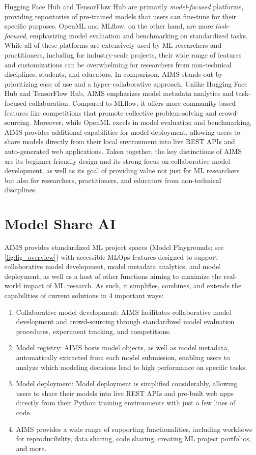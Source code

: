 Hugging Face Hub and TensorFlow Hub are primarily \textit{model-focused} platforms, providing repositories of pre-trained models that users can fine-tune for their specific purposes. OpenML and MLflow, on the other hand, are more \textit{task-focused}, emphasizing model evaluation and benchmarking on standardized tasks. While all of these platforms are extensively used by ML researchers and practitioners, including for industry-scale projects, their wide range of features and customizations can be overwhelming for researchers from non-technical disciplines, students, and educators. In comparison, AIMS stands out by prioritizing ease of use and a hyper-collaborative approach. Unlike Hugging Face Hub and TensorFlow Hub, AIMS emphasizes model metadata analytics and task-focused collaboration. Compared to MLflow, it offers more community-based features like competitions that promote collective problem-solving and crowd-sourcing. Moreover, while OpenML excels in model evaluation and benchmarking, AIMS provides additional capabilities for model deployment, allowing users to share models directly from their local environment into live REST APIs and auto-generated web applications. Taken together, the key distinctions of AIMS are its beginner-friendly design and its strong focus on collaborative model development, as well as its goal of providing value not just for ML researchers but also for researchers, practitioners, and educators from non-technical disciplines.

\section{Model Share AI}
AIMS provides standardized ML project spaces (Model Playgrounds; see \autoref{fig:fig_overview}) with accessible MLOps features designed to support collaborative model development, model metadata analytics, and model deployment, as well as a host of other functions aiming to maximize the real-world impact of ML research. As such, it simplifies, combines, and extends the capabilities of current solutions in 4 important ways:

\begin{enumerate}
    \item Collaborative model development: AIMS facilitates collaborative model development and crowd-sourcing through standardized model evaluation procedures, experiment tracking, and competitions.
    \item Model registry: AIMS hosts model objects, as well as model metadata, automatically extracted from each model submission, enabling users to analyze which modeling decisions lead to high performance on specific tasks.
    \item Model deployment: Model deployment is simplified considerably, allowing users to share their models into live REST APIs and pre-built web apps directly from their Python training environments with just a few lines of code.
    \item AIMS provides a wide range of supporting functionalities, including workflows for reproducibility, data sharing, code sharing, creating ML project portfolios, and more.
\end{enumerate}



